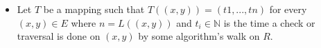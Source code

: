 \begin{defn}
\begin{itemize}
        \item Let \begin{math}T\end{math} be a mapping such that \begin{math}T((x, y)) = (t1,...,tn)\end{math} for every \begin{math}(x, y) \in E\end{math} where \begin{math}n = L((x, y))\end{math} and \begin{math} t_{i} \in \mathbb{N}\end{math} is the time a check or traversal is done on \begin{math}(x, y)\end{math} by some algorithm’s walk on \begin{math}R\end{math}.
            

\end{itemize}
\end{defn}
